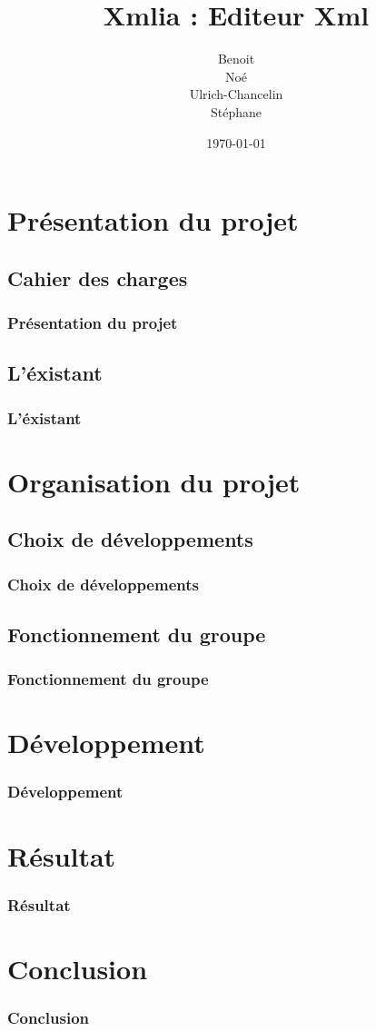 \documentclass{beamer}
\title{Xmlia : Editeur Xml}
\author {
\bsc{BOIVIN} Benoit\\
\bsc{LE PHILIPPE} Noé\\
\bsc{KEGBA-SANGO-SANGO} Ulrich-Chancelin\\
\bsc{WOUTERS} Stéphane
}
\institute{}
\date{\today}
\begin{document}
	\begin{frame}
		\titlepage
	\end{frame}
		


	\section{Présentation du projet}

	\subsection{Cahier des charges}

	\begin{frame}
		\frametitle{Présentation du projet}
	\end{frame}

	\subsection{L'éxistant}

	\begin{frame}
		\frametitle{L'éxistant}
	\end{frame}




	\section{Organisation du projet}

	\subsection{Choix de développements}

	\begin{frame}
		\frametitle{Choix de développements}
	\end{frame}

	\subsection{Fonctionnement du groupe}

	\begin{frame}
		\frametitle{Fonctionnement du groupe}
	\end{frame}




	\section{Développement}

	\begin{frame}
		\frametitle{Développement}
	\end{frame}



	\section{Résultat}

	\begin{frame}
		\frametitle{Résultat}
	\end{frame}


	\section{Conclusion}

	\begin{frame}
		\frametitle{Conclusion}
	\end{frame}
\end{document}
